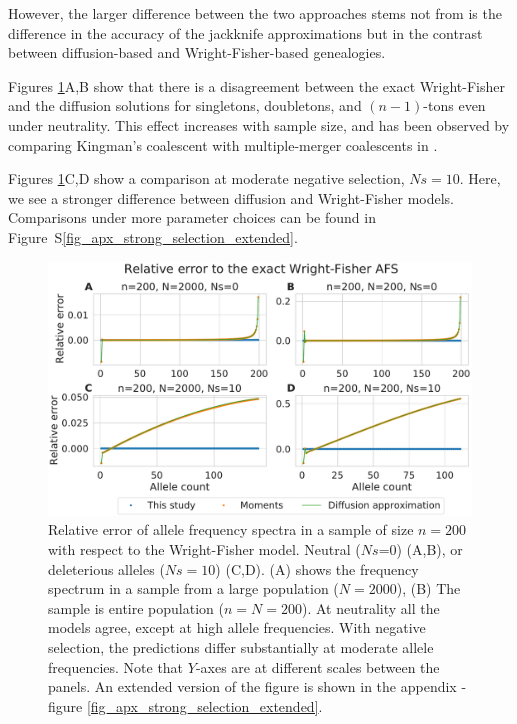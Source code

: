 \documentclass[review,nonatbib]{elsarticle}
\begin{document}
However, the larger difference between the two approaches stems not from 
is the difference in the accuracy of the jackknife approximations but in the
contrast between diffusion-based and Wright-Fisher-based genealogies.

Figures \ref{fig_strong_selection}A,B show that there is a disagreement between the exact
Wright-Fisher and the diffusion solutions for singletons, doubletons, and $(n-1)$-tons even under neutrality. 
This effect increases with sample size, and has been observed by comparing
Kingman's coalescent with multiple-merger coalescents in \citep{Fu2006, BhaskarEtAl2014}.



Figures \ref{fig_strong_selection}C,D show a comparison at moderate negative selection, $Ns=10$.
Here, we see a stronger difference between diffusion and Wright-Fisher models. 
Comparisons under more parameter choices can be found in  Figure~S\ref{fig_apx_strong_selection_extended}.

\begin{figure}
  \centering
  \includegraphics[width=0.7\textheight]{fig/afs_comp_small.pdf}

  \caption{Relative error of allele frequency spectra in a sample of size $n=200$ with respect to
    the Wright-Fisher model. Neutral ($Ns$=0) (A,B), or deleterious alleles ($Ns=10$) (C,D). (A) shows
    the frequency spectrum in a sample from a large population ($N=2000$), (B) The sample is entire
    population ($n=N=200$). At neutrality all the models agree, except at high allele frequencies.
    With negative selection, the predictions differ substantially at moderate allele frequencies.
    Note that $Y$-axes are at different scales between the panels. An extended version of the figure
    is shown in the appendix - figure \ref{fig_apx_strong_selection_extended}.}

  \label{fig_strong_selection}
\end{figure}
\end{document}
